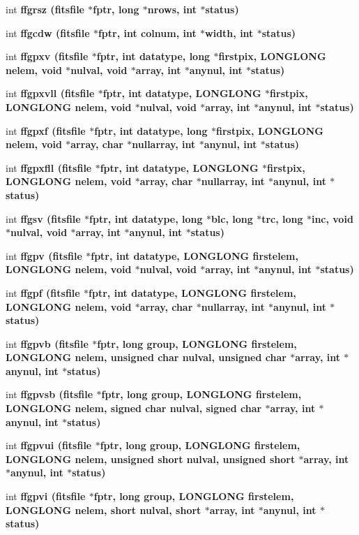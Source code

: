 \begin{CompactItemize}
int \bf{ffgrsz} (\bf{fitsfile} $\ast$fptr, long $\ast$nrows, int $\ast$status)
\item 
int \bf{ffgcdw} (\bf{fitsfile} $\ast$fptr, int colnum, int $\ast$width, int $\ast$status)
\item 
int \bf{ffgpxv} (\bf{fitsfile} $\ast$fptr, int \bf{datatype}, long $\ast$firstpix, \bf{LONGLONG} nelem, void $\ast$nulval, void $\ast$array, int $\ast$anynul, int $\ast$status)
\item 
int \bf{ffgpxvll} (\bf{fitsfile} $\ast$fptr, int \bf{datatype}, \bf{LONGLONG} $\ast$firstpix, \bf{LONGLONG} nelem, void $\ast$nulval, void $\ast$array, int $\ast$anynul, int $\ast$status)
\item 
int \bf{ffgpxf} (\bf{fitsfile} $\ast$fptr, int \bf{datatype}, long $\ast$firstpix, \bf{LONGLONG} nelem, void $\ast$array, char $\ast$nullarray, int $\ast$anynul, int $\ast$status)
\item 
int \bf{ffgpxfll} (\bf{fitsfile} $\ast$fptr, int \bf{datatype}, \bf{LONGLONG} $\ast$firstpix, \bf{LONGLONG} nelem, void $\ast$array, char $\ast$nullarray, int $\ast$anynul, int $\ast$status)
\item 
int \bf{ffgsv} (\bf{fitsfile} $\ast$fptr, int \bf{datatype}, long $\ast$blc, long $\ast$trc, long $\ast$inc, void $\ast$nulval, void $\ast$array, int $\ast$anynul, int $\ast$status)
\item 
int \bf{ffgpv} (\bf{fitsfile} $\ast$fptr, int \bf{datatype}, \bf{LONGLONG} firstelem, \bf{LONGLONG} nelem, void $\ast$nulval, void $\ast$array, int $\ast$anynul, int $\ast$status)
\item 
int \bf{ffgpf} (\bf{fitsfile} $\ast$fptr, int \bf{datatype}, \bf{LONGLONG} firstelem, \bf{LONGLONG} nelem, void $\ast$array, char $\ast$nullarray, int $\ast$anynul, int $\ast$status)
\item 
int \bf{ffgpvb} (\bf{fitsfile} $\ast$fptr, long group, \bf{LONGLONG} firstelem, \bf{LONGLONG} nelem, unsigned char nulval, unsigned char $\ast$array, int $\ast$anynul, int $\ast$status)
\item 
int \bf{ffgpvsb} (\bf{fitsfile} $\ast$fptr, long group, \bf{LONGLONG} firstelem, \bf{LONGLONG} nelem, signed char nulval, signed char $\ast$array, int $\ast$anynul, int $\ast$status)
\item 
int \bf{ffgpvui} (\bf{fitsfile} $\ast$fptr, long group, \bf{LONGLONG} firstelem, \bf{LONGLONG} nelem, unsigned short nulval, unsigned short $\ast$array, int $\ast$anynul, int $\ast$status)
\item 
int \bf{ffgpvi} (\bf{fitsfile} $\ast$fptr, long group, \bf{LONGLONG} firstelem, \bf{LONGLONG} nelem, short nulval, short $\ast$array, int $\ast$anynul, int $\ast$status)

\end{CompactItemize}
